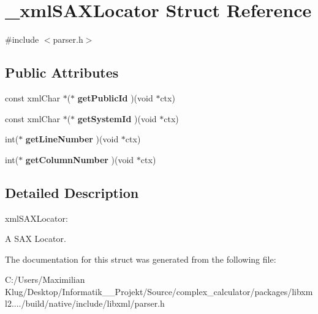 \hypertarget{struct__xml_s_a_x_locator}{}\section{\+\_\+xml\+S\+A\+X\+Locator Struct Reference}
\label{struct__xml_s_a_x_locator}


{\ttfamily \#include $<$parser.\+h$>$}

\subsection*{Public Attributes}
\begin{DoxyCompactItemize}
\item 
\mbox{\label{struct__xml_s_a_x_locator_a11597d38dc3f160c83099f1ec271c423}} 
const xml\+Char $\ast$($\ast$ {\bfseries get\+Public\+Id} )(void $\ast$ctx)
\item 
\mbox{\label{struct__xml_s_a_x_locator_a1e0593c3737ab0b589fef883852d61ba}} 
const xml\+Char $\ast$($\ast$ {\bfseries get\+System\+Id} )(void $\ast$ctx)
\item 
\mbox{\label{struct__xml_s_a_x_locator_a8a2688e388ab72c211e0a27e54d2e0c3}} 
int($\ast$ {\bfseries get\+Line\+Number} )(void $\ast$ctx)
\item 
\mbox{\label{struct__xml_s_a_x_locator_a3d0cf862955861acdee6da5280b1284d}} 
int($\ast$ {\bfseries get\+Column\+Number} )(void $\ast$ctx)
\end{DoxyCompactItemize}


\subsection{Detailed Description}
xml\+S\+A\+X\+Locator\+:

A S\+AX Locator. 

The documentation for this struct was generated from the following file\+:\begin{DoxyCompactItemize}
\item 
C\+:/\+Users/\+Maximilian Klug/\+Desktop/\+Informatik\+\_\+\_\+\+Projekt/\+Source/complex\+\_\+calculator/packages/libxml2..../build/native/include/libxml/parser.\+h\end{DoxyCompactItemize}
